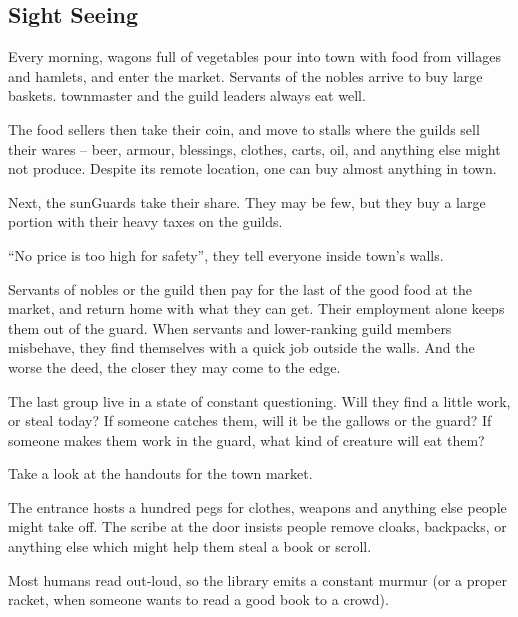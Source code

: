 \begin{multicols}{2}

\subsection{Sight Seeing}


Every morning, wagons full of vegetables pour into \gls{town} with food from \glspl{village} and hamlets, and enter the market.
Servants of the nobles arrive to buy large baskets.
\Gls{townmaster} and the guild leaders always eat well.

The food sellers then take their coin, and move to stalls where the guilds sell their wares -- beer, armour, blessings, clothes, carts, oil, and anything else  might not produce.
Despite its remote location, one can buy almost anything in \gls{town}.

Next, the \glspl{sunGuard} take their share.
They may be few, but they buy a large portion with their heavy taxes on the guilds.

``No price is too high for safety'', they tell everyone inside \gls{town}'s walls.

Servants of nobles or the guild then pay for the last of the good food at the market, and return home with what they can get.
Their employment alone keeps them out of the \gls{guard}.
When servants and lower-ranking guild members misbehave, they find themselves with a quick job outside the walls.
And the worse the deed, the closer they may come to the \gls{edge}.

The last group live in a state of constant questioning.
Will they find a little work, or steal today?
If someone catches them, will it be the gallows or the guard?
If someone makes them work in the \gls{guard}, what kind of creature will eat them?

Take a look at the handouts for the \gls{town} market.


The entrance hosts a hundred pegs for clothes, weapons and anything else people might take off.
The \gls{scribe} at the door insists people remove cloaks, backpacks, or anything else which might help them steal a book or scroll.

Most humans read out-loud, so the library emits a constant murmur (or a proper racket, when someone wants to read a good book to a crowd).


\end{multicols}
